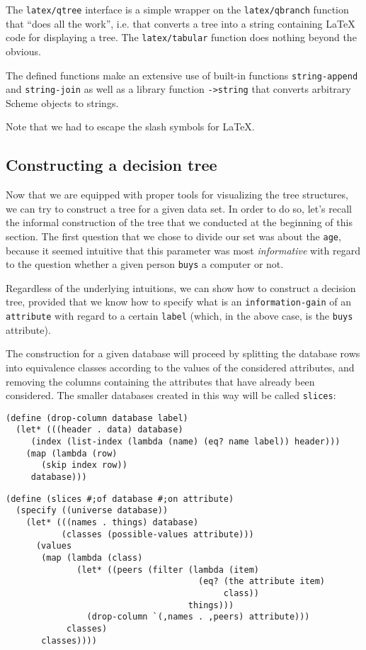 The \texttt{latex/qtree} interface is a simple wrapper on the
\texttt{latex/qbranch} function that ``does all the work'', i.e.
that converts a tree into a string containing \LaTeX{} code
for displaying a tree. The \texttt{latex/tabular} function
does nothing beyond the obvious.

The defined functions make an extensive use of built-in functions
\texttt{string\--append} and \texttt{string\--join} as well as
a library function \texttt{->string} that converts arbitrary
Scheme objects to strings.

Note that we had to escape the slash symbols for \LaTeX{}.

\subsection{Constructing a decision tree}

Now that we are equipped with proper tools for visualizing
the tree structures, we can try to construct a tree for
a given data set. In order to do so, let's recall the informal
construction of the tree that we conducted at the beginning
of this section. The first question that we chose to divide
our set was about the \texttt{age}, because it seemed
intuitive that this parameter was most \textit{informative}
with regard to the question whether a given person \texttt{buys}
a computer or not.

Regardless of the underlying intuitions, we can show how to
construct a decision tree, provided that we know how to
specify what is an \texttt{information\--gain} of an
\texttt{attribute} with regard to a certain \texttt{label}
(which, in the above case, is the \texttt{buys} attribute).

The construction for a given database will proceed by
splitting the database rows into equivalence classes
according to the values of the considered attributes,
and removing the columns containing the attributes that
have already been considered. The smaller databases
created in this way will be called \texttt{slices}:

\begin{Verbatim}[samepage=true]
(define (drop-column database label)
  (let* (((header . data) database)
	 (index (list-index (lambda (name) (eq? name label)) header)))
    (map (lambda (row)
	   (skip index row))
	 database)))
\end{Verbatim}
\begin{Verbatim}[samepage=true]
(define (slices #;of database #;on attribute)
  (specify ((universe database))
    (let* (((names . things) database)
           (classes (possible-values attribute)))
      (values
       (map (lambda (class)
              (let* ((peers (filter (lambda (item)
                                      (eq? (the attribute item)
                                           class))
                                    things)))
                (drop-column `(,names . ,peers) attribute)))
            classes)
       classes))))
\end{Verbatim}

